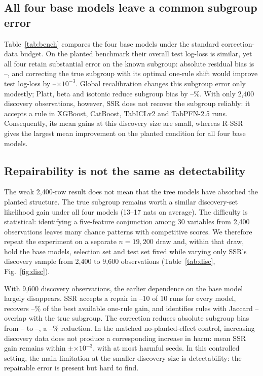 \documentclass[conference]{IEEEtran}
\begin{document}
\subsection{All four base models leave a common subgroup error}
Table~\ref{tab:bench} compares the four base models under the standard correction-data
budget. On the planted benchmark their overall test log-loss is similar, yet all four retain
substantial error on the known subgroup: absolute residual bias is \BBiasLo--\BBiasHi, and
correcting the true subgroup with its optimal one-rule shift would improve test log-loss by
\BOracleLo--\BOracleHi$\times10^{-3}$. Global recalibration changes this subgroup error only
modestly; Platt, beta and isotonic reduce subgroup bias by \BCalRedLo--\BCalRedHi\%. With only 2{,}400 discovery
observations, however, SSR does not recover the subgroup reliably: it accepts a rule in
\BXgbPlRep{} XGBoost, \BCatPlRep{} CatBoost, \BIclPlRep{} TabICLv2 and \BPfnPlRep{} TabPFN-2.5
runs. Consequently, its mean gains at this discovery size are small, whereas R-SSR gives
the largest mean improvement on the planted condition for all four base models.

\subsection{Repairability is not the same as detectability}
The weak 2{,}400-row result does not mean that the tree models have absorbed the planted
structure. The true subgroup remains worth a similar discovery-set likelihood gain under all four
models (13--17 nats on average). The difficulty is statistical: identifying a five-feature
conjunction among 30 variables from 2{,}400 observations leaves many chance patterns with competitive
scores. We therefore repeat the experiment on a separate $n=19{,}200$ draw and, within that draw,
hold the base models, selection set and test set fixed while varying only SSR's discovery
sample from 2{,}400 to 9{,}600 observations (Table~\ref{tab:disc}, Fig.~\ref{fig:disc}).

With 9{,}600 discovery observations, the earlier dependence on the base model largely disappears.
SSR accepts a repair in \DRepLo--10 of 10 runs for every model, recovers
\DShareLo--\DShareHi\% of the best available one-rule gain, and identifies rules with Jaccard
\DJacLo--\DJacHi{} overlap with the true subgroup. The correction reduces absolute subgroup bias
from \DBiasFLo--\DBiasFHi{} to \DBiasSLo--\DBiasSHi, a \DBiasRedLo--\DBiasRedHi\% reduction.
In the matched no-planted-effect control, increasing discovery data does not produce a corresponding
increase in harm: mean SSR gain remains within $\pm$\DNullAbsMax$\times10^{-3}$, with at most
\DNullHarmMax{} harmful seeds. In this controlled setting, the main limitation at the smaller
discovery size is detectability: the repairable error is present but hard to find.
\end{document}
